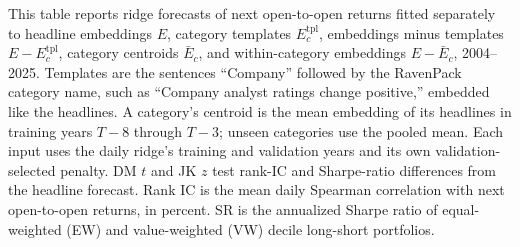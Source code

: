\begin{table}[htbp]
\centering
\caption{Forecasts Retrained on Templates and Centroids}
\label{tab:tabA_probe}
\begin{minipage}{\linewidth}\footnotesize
This table reports ridge forecasts of next open-to-open returns fitted separately to headline embeddings $E$, category templates $E_c^{\mathrm{tpl}}$, embeddings minus templates $E-E_c^{\mathrm{tpl}}$, category centroids $\bar E_c$, and within-category embeddings $E-\bar E_c$, 2004--2025. Templates are the sentences ``Company'' followed by the RavenPack category name, such as ``Company analyst ratings change positive,'' embedded like the headlines. A category's centroid is the mean embedding of its headlines in training years $T-8$ through $T-3$; unseen categories use the pooled mean. Each input uses the daily ridge's training and validation years and its own validation-selected penalty. DM $t$ and JK $z$ test rank-IC and Sharpe-ratio differences from the headline forecast. Rank IC is the mean daily Spearman correlation with next open-to-open returns, in percent. SR is the annualized Sharpe ratio of equal-weighted (EW) and value-weighted (VW) decile long-short portfolios.
\end{minipage}
\medskip


\end{table}
